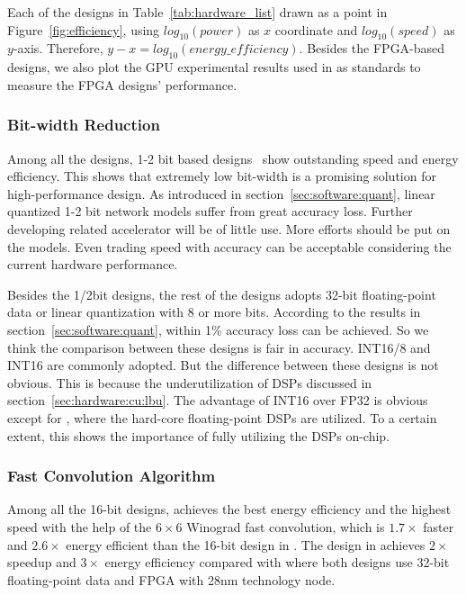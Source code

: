 Each of the designs in Table~\ref{tab:hardware_list} drawn as a point in Figure~\ref{fig:efficiency}, using $log_{10}(power)$ as $x$ coordinate and $log_{10}(speed)$ as $y$-axis. Therefore, $y-x=log_{10}(energy\_efficiency)$. Besides the FPGA-based designs, we also plot the GPU experimental results used in \cite{guo2017angel, han2017ese} as standards to measure the FPGA designs' performance.

\subsubsection*{\textbf{Bit-width Reduction}} Among all the designs, 1-2 bit based designs~\cite{jiao2017accelerating, moss2017high, nakahara2017fully} show outstanding speed and energy efficiency. This shows that extremely low bit-width is a promising solution for high-performance design. As introduced in section~\ref{sec:software:quant}, linear quantized 1-2 bit network models suffer from great accuracy loss. Further developing related accelerator will be of little use. More efforts should be put on the models. Even trading speed with accuracy can be acceptable considering the current hardware performance.

Besides the 1/2bit designs, the rest of the designs adopts 32-bit floating-point data or linear quantization with 8 or more bits. According to the results in section~\ref{sec:software:quant}, within 1\% accuracy loss can be achieved. So we think the comparison between these designs is fair in accuracy. INT16/8 and INT16 are commonly adopted. But the difference between these designs is not obvious. This is because the underutilization of DSPs discussed in section~\ref{sec:hardware:cu:lbu}. The advantage of INT16 over FP32 is obvious except for \cite{zhang2017improving}, where the hard-core floating-point DSPs are utilized. To a certain extent, this shows the importance of fully utilizing the DSPs on-chip.

\subsubsection*{\textbf{Fast Convolution Algorithm}} Among all the 16-bit designs, \cite{lu2017evaluating} achieves the best energy efficiency and the highest speed with the help of the $6\times 6$ Winograd fast convolution, which is $1.7\times$ faster and $2.6\times$ energy efficient than the 16-bit design in \cite{zhang2017improving}. The design in \cite{zhang2017frequency} achieves $2\times$ speedup and $3\times$ energy efficiency compared with \cite{zhang2015optimizing} where both designs use 32-bit floating-point data and FPGA with 28nm technology node. 

